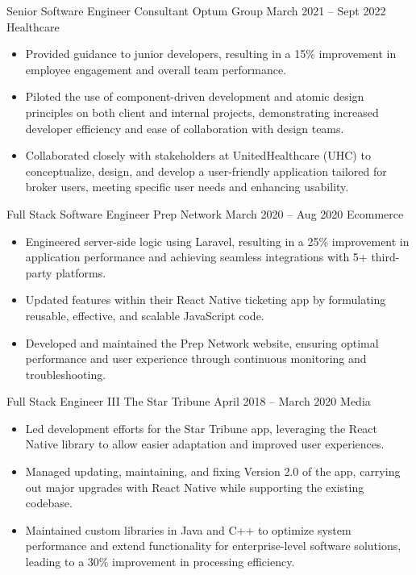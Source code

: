 \medskip

\cvexperience
{Senior Software Engineer Consultant}
{Optum Group}
{March 2021 – Sept 2022}
{Healthcare}
{\footnotesize\faCode \hspace{1pt}      }
\begin{itemize}
    \item Provided guidance to junior developers, resulting in a 15\% improvement in employee engagement and overall team performance.
    \item Piloted the use of component-driven development and atomic design principles on both client and internal projects, demonstrating increased developer efficiency and ease of collaboration with design teams.
    \item Collaborated closely with stakeholders at UnitedHealthcare (UHC) to conceptualize, design, and develop a user-friendly application tailored for broker users, meeting specific user needs and enhancing usability.
\end{itemize}

\medskip

\cvexperience
{Full Stack Software Engineer}
{Prep Network}
{March 2020 – Aug 2020}
{Ecommerce}
{\footnotesize\faCode \hspace{1pt}       }
\begin{itemize}
    \item Engineered server-side logic using Laravel, resulting in a 25\% improvement in application performance and achieving seamless integrations with 5+ third-party platforms.
    \item Updated features within their React Native ticketing app by formulating reusable, effective, and scalable JavaScript code.
    \item Developed and maintained the Prep Network website, ensuring optimal performance and user experience through continuous monitoring and troubleshooting.
\end{itemize}
\medskip
\cvexperience
{Full Stack Engineer III}
{The Star Tribune}
{April 2018 – March 2020}
{Media}
{\footnotesize\faCode \hspace{1pt}       }
\begin{itemize}
    \item Led development efforts for the Star Tribune app, leveraging the React Native library to allow easier adaptation and improved user experiences.
    \item Managed updating, maintaining, and fixing Version 2.0 of the app, carrying out major upgrades with React Native while supporting the existing codebase.
    \item Maintained custom libraries in Java and C++ to optimize system performance and extend functionality for enterprise-level software solutions, leading to a 30\% improvement in processing efficiency.
\end{itemize}

